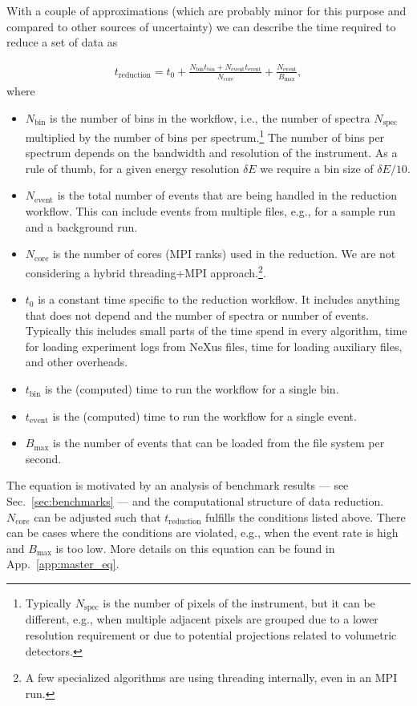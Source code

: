 \documentclass[a4paper,english,numbers=noenddot,bibliography=totoc,chapterprefix=on,DIV=12]{scrartcl}
\newcommand{\Treduction}{t_{\text{reduction}}}
\newcommand{\Tbin}{t_{\text{bin}}}
\newcommand{\Tevent}{t_{\text{event}}}
\newcommand{\Nbin}{N_{\text{bin}}}
\newcommand{\Ncore}{N_{\text{core}}}
\newcommand{\Nevent}{N_{\text{event}}}
\newcommand{\Nspec}{N_{\text{spec}}}
\newcommand{\Bmax}{B_{\text{max}}}
\begin{document}
With a couple of approximations (which are probably minor for this purpose and compared to other sources of uncertainty) we can describe the time required to reduce a set of data as

\begin{align}
  \Treduction = t_0 + \frac{\Nbin\Tbin + \Nevent\Tevent}{\Ncore} + \frac{\Nevent}{\Bmax},
  \label{eq:master}
\end{align}
where
\begin{itemize}
  \item $\Nbin$ is the number of bins in the workflow, i.e., the number of spectra $\Nspec$ multiplied by the number of bins per spectrum.\footnote{Typically $\Nspec$ is the number of pixels of the instrument, but it can be different, e.g., when multiple adjacent pixels are grouped due to a lower resolution requirement or due to potential projections related to volumetric detectors.}
    The number of bins per spectrum depends on the bandwidth and resolution of the instrument.
    As a rule of thumb, for a given energy resolution $\delta E$ we require a bin size of $\delta E/10$.
  \item $\Nevent$ is the total number of events that are being handled in the reduction workflow.
    This can include events from multiple files, e.g., for a sample run and a background run.
  \item $\Ncore$ is the number of cores (MPI ranks) used in the reduction.
    We are not considering a hybrid threading+MPI approach.\footnote{A few specialized algorithms are using threading internally, even in an MPI run.}.
  \item $t_0$ is a constant time specific to the reduction workflow.
    It includes anything that does not depend and the number of spectra or number of events.
    Typically this includes small parts of the time spend in every algorithm, time for loading experiment logs from NeXus files, time for loading auxiliary files, and other overheads.
  \item $\Tbin$ is the (computed) time to run the workflow for a single bin.
  \item $\Tevent$ is the (computed) time to run the workflow for a single event.
  \item $\Bmax$ is the number of events that can be loaded from the file system per second.
\end{itemize}
The equation is motivated by an analysis of benchmark results --- see Sec.~\ref{sec:benchmarks} --- and the computational structure of data reduction.
$\Ncore$ can be adjusted such that $\Treduction$ fulfills the conditions listed above.
There can be cases where the conditions are violated, e.g., when the event rate is high and $\Bmax$ is too low.
More details on this equation can be found in App.~\ref{app:master_eq}.
\end{document}
